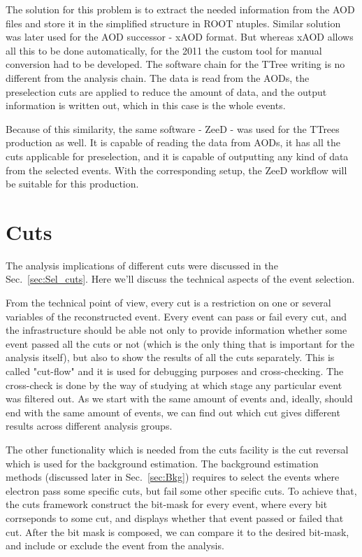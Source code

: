 The solution for this problem is to extract the needed information from the AOD files and store it in the simplified structure in ROOT ntuples. Similar solution was later used for the AOD successor - xAOD format. But whereas xAOD allows all this to be done automatically, for the 2011 the custom tool for manual conversion had to be developed. The software chain for the TTree writing is no different from the analysis chain. The data is read from the AODs, the preselection cuts are applied to reduce the amount of data, and the output information is written out, which in this case is the whole events.

Because of this similarity, the same software - ZeeD - was used for the TTrees production as well. It is capable of reading the data from AODs, it has all the cuts applicable for preselection, and it is capable of outputting any kind of data from the selected events. With the corresponding setup, the ZeeD workflow will be suitable for this production.

\section{Cuts}

The analysis implications of different cuts were discussed in the Sec.~\ref{sec:Sel_cuts}. Here we'll discuss the technical aspects of the event selection.

From the technical point of view, every cut is a restriction on one or several variables of the reconstructed event. Every event can pass or fail every cut, and the infrastructure should be able not only to provide information whether some event passed all the cuts or not (which is the only thing that is important for the analysis itself), but also to show the results of all the cuts separately. This is called "cut-flow" and it is used for debugging purposes and cross-checking. The cross-check is done by the way of studying at which stage any particular event was filtered out. As we start with the same amount of events and, ideally, should end with the same amount of events, we can find out which cut gives different results across different analysis groups.

The other functionality which is needed from the cuts facility is the cut reversal which is used for the background estimation. The background estimation methods (discussed later in Sec.~\ref{sec:Bkg}) requires to select the events where electron pass some specific cuts, but fail some other specific cuts. To achieve that, the cuts framework construct the bit-mask for every event, where every bit corrseponds to some cut, and displays whether that event passed or failed that cut. After the bit mask is composed, we can compare it to the desired bit-mask, and include or exclude the event from the analysis.

